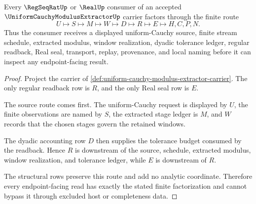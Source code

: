 \begin{theorem}
\label{thm:uniform-cauchy-modulus-extractor-readback-route}
Every $\RegSeqRatUp$ or $\RealUp$ consumer of an accepted $\UniformCauchyModulusExtractorUp$ carrier factors through the finite route
$$
U \longmapsto S \longmapsto M \longmapsto W \longmapsto D \longmapsto R \longmapsto E \longmapsto H,C,P,N .
$$
Thus the consumer receives a displayed uniform-Cauchy source, finite stream schedule, extracted modulus, window realization, dyadic tolerance ledger, regular readback, Real seal, transport, replay, provenance, and local naming before it can inspect any endpoint-facing result.
\end{theorem}
\begin{proof}
Project the carrier of \autoref{def:uniform-cauchy-modulus-extractor-carrier}. The only regular readback row is $R$, and the only Real seal row is $E$.

The source route comes first. The uniform-Cauchy request is displayed by $U$, the finite observations are named by $S$, the extracted stage ledger is $M$, and $W$ records that the chosen stages govern the retained windows.

The dyadic accounting row $D$ then supplies the tolerance budget consumed by the readback. Hence $R$ is downstream of the source, schedule, extracted modulus, window realization, and tolerance ledger, while $E$ is downstream of $R$.

The structural rows preserve this route and add no analytic coordinate. Therefore every endpoint-facing read has exactly the stated finite factorization and cannot bypass it through excluded host or completeness data.
\end{proof}



